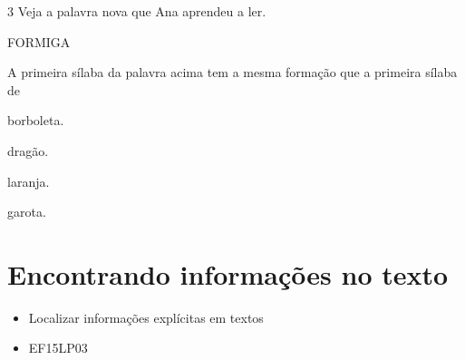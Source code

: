 \num{3} Veja a palavra nova que Ana aprendeu a ler.

\begin{myquote}
FORMIGA
\end{myquote}

A primeira sílaba da palavra acima tem a mesma formação que a 
primeira sílaba de

\begin{escolha}
\item borboleta.

\item dragão.

\item laranja.

\item garota.
\end{escolha}


\chapter{Encontrando informações no texto}



\begin{itemize}
	\item Localizar informações explícitas em textos
\end{itemize}


\begin{itemize}
\item EF15LP03
\end{itemize}


